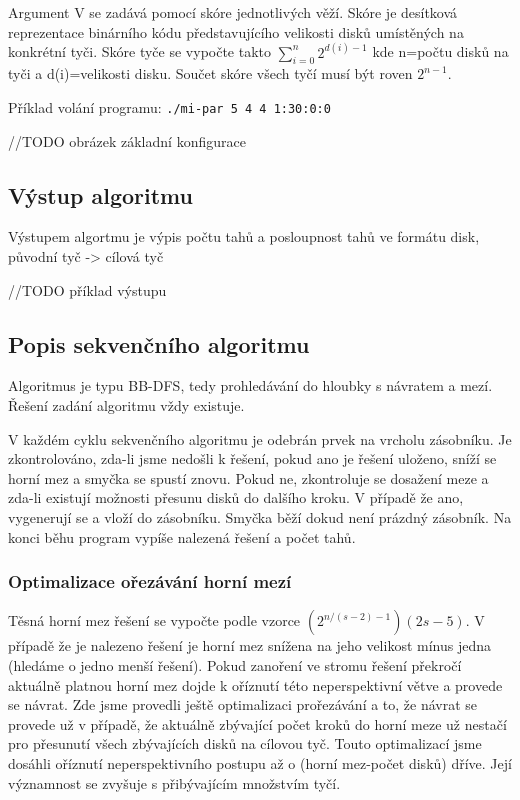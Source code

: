 \documentclass[12pt]{article}
\begin{document}
Argument V se zadává pomocí skóre jednotlivých věží. Skóre je desítková reprezentace binárního kódu představujícího velikosti disků umístěných na konkrétní tyči. Skóre tyče se vypočte takto $\displaystyle\sum\limits_{i=0}^n {2^{d(i)-1}}$ kde n=počtu disků na tyči a d(i)=velikosti disku. Součet skóre všech tyčí musí být roven $2^{n-1}$.

Příklad volání programu:
\texttt{./mi-par 5 4 4 1:30:0:0}



//TODO obrázek základní konfigurace



\subsection{Výstup algoritmu}
Výstupem algortmu je výpis počtu tahů a posloupnost tahů ve formátu disk, původní tyč -> cílová tyč



//TODO  příklad výstupu


\subsection{Popis sekvenčního algoritmu}
Algoritmus je typu BB-DFS, tedy prohledávání do hloubky s návratem a mezí. Řešení zadání algoritmu vždy existuje. 

V každém cyklu sekvenčního algoritmu je odebrán prvek na vrcholu zásobníku. Je zkontrolováno, zda-li jsme nedošli k řešení, pokud ano je řešení uloženo, sníží se horní mez a smyčka se spustí znovu. Pokud ne, zkontroluje se dosažení meze a zda-li existují možnosti přesunu disků do dalšího kroku. V případě že ano, vygenerují se  a vloží do zásobníku. Smyčka běží dokud není prázdný zásobník. Na konci běhu program vypíše nalezená řešení a počet tahů.

\subsubsection{Optimalizace ořezávání horní mezí}
Těsná horní mez řešení se vypočte podle vzorce $(2^{n/(s-2)-1})(2s-5)$. V případě že je nalezeno řešení je horní mez snížena na jeho velikost mínus jedna (hledáme o jedno menší řešení). Pokud zanoření ve stromu řešení překročí aktuálně platnou horní mez dojde k oříznutí této neperspektivní větve a provede se návrat. Zde jsme provedli ještě optimalizaci prořezávání a to, že návrat se provede už v případě, že aktuálně zbývající počet kroků do horní meze už nestačí pro přesunutí všech zbývajících disků na cílovou tyč. Touto optimalizací jsme dosáhli oříznutí neperspektivního postupu až o (horní mez-počet disků) dříve. Její významnost se zvyšuje s přibývajícím množstvím tyčí.
\end{document}
